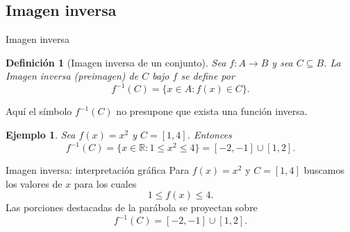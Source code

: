 \documentclass[aspectratio=169,10pt]{beamer}
\newtheorem{definicion}{Definición}
\newtheorem{ejemplo}{Ejemplo}
\newcommand{\R}{\mathbb{R}}
\begin{document}
\subsection*{Imagen inversa}
\begin{frame}{Imagen inversa}

\begin{definicion}[Imagen inversa de un conjunto]
Sea $f:A\to B$ y sea $C\subseteq B$. La Imagen inversa (preimagen) de $C$ bajo $f$ se define por
\[
f^{-1}(C)=\{x\in A:f(x)\in C\}.
\]
\end{definicion}

Aquí el símbolo $f^{-1}(C)$ no presupone que exista una función inversa.

\begin{ejemplo}
Sea $f(x)=x^2$ y $C=[1,4]$. Entonces
\[
f^{-1}(C)=\{x\in\R:1\leq x^2\leq4\}
=[-2,-1]\cup[1,2].
\]

\end{ejemplo}

\end{frame}

\begin{frame}{Imagen inversa: interpretación gráfica}
Para $f(x)=x^2$ y $C=[1,4]$ buscamos los valores de $x$ para los cuales
\[
1\le f(x)\le4.
\]
Las porciones destacadas de la parábola se proyectan sobre
\[
f^{-1}(C)=[-2,-1]\cup[1,2].
\]
\begin{center}
\end{center}
\end{frame}
\end{document}
